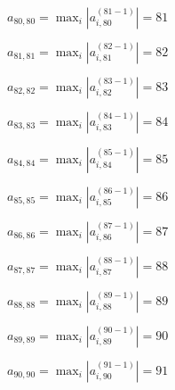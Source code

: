 \documentclass[a4paper,12pt]{article}
\begin{document}
$a _{ 80, 80 } =  \max _i |a _{ i, 80 } ^{ (81 - 1) } | = 81$

$a _{ 81, 81 } =  \max _i |a _{ i, 81 } ^{ (82 - 1) } | = 82$

$a _{ 82, 82 } =  \max _i |a _{ i, 82 } ^{ (83 - 1) } | = 83$

$a _{ 83, 83 } =  \max _i |a _{ i, 83 } ^{ (84 - 1) } | = 84$

$a _{ 84, 84 } =  \max _i |a _{ i, 84 } ^{ (85 - 1) } | = 85$

$a _{ 85, 85 } =  \max _i |a _{ i, 85 } ^{ (86 - 1) } | = 86$

$a _{ 86, 86 } =  \max _i |a _{ i, 86 } ^{ (87 - 1) } | = 87$

$a _{ 87, 87 } =  \max _i |a _{ i, 87 } ^{ (88 - 1) } | = 88$

$a _{ 88, 88 } =  \max _i |a _{ i, 88 } ^{ (89 - 1) } | = 89$

$a _{ 89, 89 } =  \max _i |a _{ i, 89 } ^{ (90 - 1) } | = 90$

$a _{ 90, 90 } =  \max _i |a _{ i, 90 } ^{ (91 - 1) } | = 91$
\end{document}
